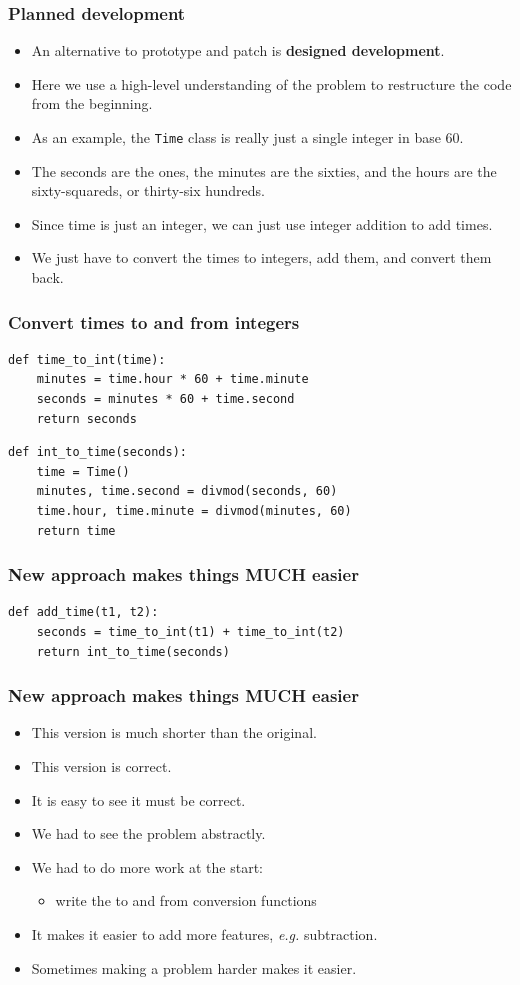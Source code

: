 \documentclass{beamer}
\newcommand{\bi}{\begin{itemize}}
\newcommand{\li}{\item}
\newcommand{\ei}{\end{itemize}}
\newcommand{\bfr}[1]{\begin{frame}[fragile]\frametitle{{ #1 }}}
\begin{document}
\bfr{Planned development}
\bi
\li 
An alternative to prototype and patch is {\bf designed development}.
\li
Here we use a high-level understanding of the problem to restructure
the code from the beginning.
\li
As an example, the \lstinline{Time} class is really just a single
integer in base 60.
\li
The seconds are the ones, the minutes are the sixties, and the 
hours are the sixty-squareds, or thirty-six hundreds.
\li
Since time is just an integer, we can just use integer addition
to add times.
\li We just have to convert the times to integers, add them,
and convert them back.
\ei
\end{frame}

\bfr{Convert times to and from integers}
\begin{lstlisting}
def time_to_int(time):
    minutes = time.hour * 60 + time.minute
    seconds = minutes * 60 + time.second
    return seconds
\end{lstlisting}
\begin{lstlisting}
def int_to_time(seconds):
    time = Time()
    minutes, time.second = divmod(seconds, 60)
    time.hour, time.minute = divmod(minutes, 60)
    return time
\end{lstlisting}
\end{frame}

\bfr{New approach makes things MUCH easier}
\begin{lstlisting}
def add_time(t1, t2):
    seconds = time_to_int(t1) + time_to_int(t2)
    return int_to_time(seconds)
\end{lstlisting}

\end{frame}

\bfr{New approach makes things MUCH easier}
\bi
\li This version is much shorter than the original.
\li This version is correct.
\li It is easy to see it must be correct.
\li We had to see the problem abstractly.
\li We had to do more work at the start:
\bi \li write the to and from conversion functions \ei
\li It makes it easier to add more features, {\em e.g.} subtraction.
\li Sometimes making a problem harder makes it easier.
\ei
\end{frame}
\end{document}
